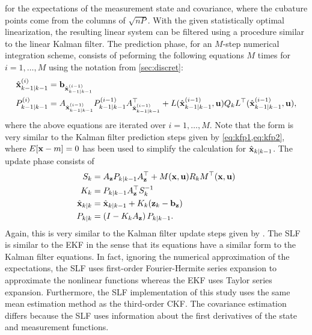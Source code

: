 \documentclass[../zhang_thesis.tex]{subfiles}
\begin{document}
for the expectations of the measurement state and covariance, where the cubature points come from the columns of $\sqrt{nP}$. With the given statistically optimal linearization, the resulting linear system can be filtered using a procedure similar to the linear Kalman filter. The prediction phase, for an $M$-step numerical integration scheme, consists of peforming the following equations $M$ times for $i=1,\dots,M$ using the notation from \cref{sec:discret}:
\begin{align}
    \hat{\mathbf{x}}_{k-1|k-1}^{(i)} &= \mathbf{b}_{\hat{\mathbf{x}}_{k-1|k-1}^{(i-1)}} \\
    P_{k-1|k-1}^{(i)} &= A_{\hat{\mathbf{x}}_{k-1|k-1}^{(i-1)}} P_{k-1|k-1}^{(i-1)} A_{\hat{\mathbf{x}}_{k-1|k-1}^{(i-1)}}^\top + L({\hat{\mathbf{x}}_{k-1|k-1}^{(i-1)}},\mathbf{u}) Q_k L^\top({\hat{\mathbf{x}}_{k-1|k-1}^{(i-1)}},\mathbf{u}),
\end{align}
where the above equations are iterated over $i=1,\dots,M$. Note that the form is very similar to the Kalman filter prediction steps given by \cref{eq:kfp1,eq:kfp2}, where $E[\mathbf{x}-m]=0$ has been used to simplify the calculation for $\hat{\mathbf{x}}_{k|k-1}$. The update phase consists of
\begin{align}
    S_k &= A_{\mathbf{z}} P_{k|k-1} A_{\mathbf{z}}^\top + M(\mathbf{x},\mathbf{u}) R_k M^\top(\mathbf{x},\mathbf{u}) \\
    K_k &= P_{k|k-1} A_{\mathbf{z}}^\top S_k^{-1} \\
    \hat{\mathbf{x}}_{k|k} &= \hat{\mathbf{x}}_{k|k-1} + K_k (\mathbf{z}_k - \mathbf{b}_{\mathbf{z}}) \\
    P_{k|k} &= \left( I - K_k A_{\mathbf{z}} \right) P_{k|k-1}. \label{eq:slfl}
\end{align}
Again, this is very similar to the Kalman filter update steps given by . The SLF is similar to the EKF in the sense that its equations have a similar form to the Kalman filter equations. In fact, ignoring the numerical approximation of the expectations, the SLF uses first-order Fourier-Hermite series expansion to approximate the nonlinear functions whereas the EKF uses Taylor series expansion. Furthermore, the SLF implementation of this study uses the same
mean estimation method as the third-order CKF. The covariance estimation differs because the SLF uses information about the first derivatives of the state and measurement functions.
\end{document}
